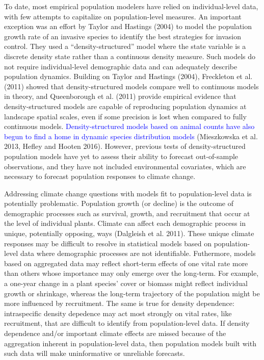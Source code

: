 \documentclass[12pt,]{article}
\begin{document}
To date, most empirical population modelers have relied on
individual-level data, with few attempts to capitalize on
population-level measures. An important exception was an effort by
Taylor and Hastings (2004) to model the population growth rate of an
invasive species to identify the best strategies for invasion control.
They used a ``density-structured'' model where the state variable is a
discrete density state rather than a continuous density measure. Such
models do not require individual-level demographic data and can
adequately describe population dynamics. Building on Taylor and Hastings
(2004), Freckleton et al. (2011) showed that density-structured models
compare well to continuous models in theory, and Queenborough et al.
(2011) provide empirical evidence that density-structured models are
capable of reproducing population dynamics at landscape spatial scales,
even if some precision is lost when compared to fully continuous models.
\textcolor{blue}{Density-structured models based on animal counts have also begun to find a home in dynamic species distribution models}
(Mieszkowska et al. 2013, Hefley and Hooten 2016). However, previous
tests of density-structured population models have yet to assess their
ability to forecast out-of-sample observations, and they have not
included environmental covariates, which are necessary to forecast
population responses to climate change.

Addressing climate change questions with models fit to population-level
data is potentially problematic. Population growth (or decline) is the
outcome of demographic processes such as survival, growth, and
recruitment that occur at the level of individual plants. Climate can
affect each demographic process in unique, potentially opposing, ways
(Dalgleish et al. 2011). These unique climate responses may be difficult
to resolve in statistical models based on population-level data where
demographic processes are not identifiable. Futhermore, models based on
aggregated data may reflect short-term effects of one vital rate more
than others whose importance may only emerge over the long-term. For
example, a one-year change in a plant species' cover or biomass might
reflect individual growth or shrinkage, whereas the long-term trajectory
of the population might be more influenced by recruitment. The same is
true for density dependence: intraspecific density depedence may act
most strongly on vital rates, like recruitment, that are difficult to
identify from population-level data. If density dependence and/or
important climate effects are missed because of the aggregation inherent
in population-level data, then population models built with such data
will make uninformative or unreliable forecasts.
\end{document}
